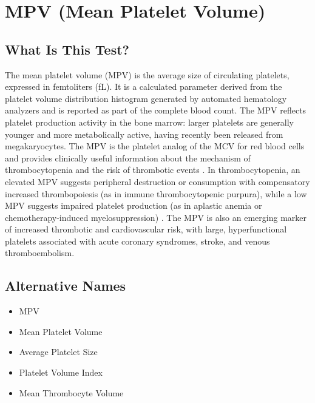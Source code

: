 \chapter{MPV (Mean Platelet Volume)}

\section*{What Is This Test?}
The mean platelet volume (MPV) is the average size of circulating platelets, expressed in femtoliters (fL). It is a calculated parameter derived from the platelet volume distribution histogram generated by automated hematology analyzers and is reported as part of the complete blood count. The MPV reflects platelet production activity in the bone marrow: larger platelets are generally younger and more metabolically active, having recently been released from megakaryocytes. The MPV is the platelet analog of the MCV for red blood cells and provides clinically useful information about the mechanism of thrombocytopenia and the risk of thrombotic events \cite{tierney2023current}. In thrombocytopenia, an elevated MPV suggests peripheral destruction or consumption with compensatory increased thrombopoiesis (as in immune thrombocytopenic purpura), while a low MPV suggests impaired platelet production (as in aplastic anemia or chemotherapy-induced myelosuppression) \cite{wallach2022interpretation}. The MPV is also an emerging marker of increased thrombotic and cardiovascular risk, with large, hyperfunctional platelets associated with acute coronary syndromes, stroke, and venous thromboembolism.

\section*{Alternative Names}
\begin{itemize}
  \item MPV
  \item Mean Platelet Volume
  \item Average Platelet Size
  \item Platelet Volume Index
  \item Mean Thrombocyte Volume
\end{itemize}

